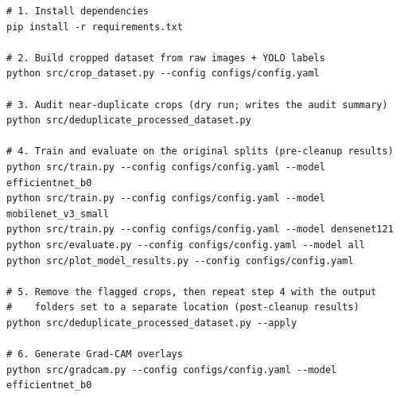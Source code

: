\documentclass[11pt,a4paper]{article}
\begin{document}
\begin{lstlisting}[numbers=none,caption={End-to-end commands}]
# 1. Install dependencies
pip install -r requirements.txt

# 2. Build cropped dataset from raw images + YOLO labels
python src/crop_dataset.py --config configs/config.yaml

# 3. Audit near-duplicate crops (dry run; writes the audit summary)
python src/deduplicate_processed_dataset.py

# 4. Train and evaluate on the original splits (pre-cleanup results)
python src/train.py --config configs/config.yaml --model efficientnet_b0
python src/train.py --config configs/config.yaml --model mobilenet_v3_small
python src/train.py --config configs/config.yaml --model densenet121
python src/evaluate.py --config configs/config.yaml --model all
python src/plot_model_results.py --config configs/config.yaml

# 5. Remove the flagged crops, then repeat step 4 with the output
#    folders set to a separate location (post-cleanup results)
python src/deduplicate_processed_dataset.py --apply

# 6. Generate Grad-CAM overlays
python src/gradcam.py --config configs/config.yaml --model efficientnet_b0
\end{lstlisting}

\FloatBarrier
\clearpage

\end{document}
